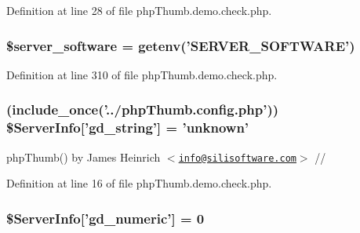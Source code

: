 \-Definition at line 28 of file php\-Thumb.\-demo.\-check.\-php.

\hypertarget{php_thumb_8demo_8check_8php_a21f2f1ca62b06bd0a188ee2e239db5ff}{
\subsubsection[{\$server\-\_\-software}]{\setlength{\rightskip}{0pt plus 5cm}\$server\-\_\-software = getenv('\-S\-E\-R\-V\-E\-R\-\_\-\-S\-O\-F\-T\-W\-A\-R\-E')}}\label{php_thumb_8demo_8check_8php_a21f2f1ca62b06bd0a188ee2e239db5ff}


\-Definition at line 310 of file php\-Thumb.\-demo.\-check.\-php.

\hypertarget{php_thumb_8demo_8check_8php_a9fc19f5767062100c17dfcd62a18cf40}{
\subsubsection[{\$\-Server\-Info}]{ (include\-\_\-once('../php\-Thumb.\-config.\-php')) \$\-Server\-Info\mbox{[}'gd\-\_\-string'\mbox{]} = 'unknown'}}\label{php_thumb_8demo_8check_8php_a9fc19f5767062100c17dfcd62a18cf40}
php\-Thumb() by \-James \-Heinrich $<$\href{mailto:info@silisoftware.com}{\tt info@silisoftware.\-com}$>$ // 

\-Definition at line 16 of file php\-Thumb.\-demo.\-check.\-php.

\hypertarget{php_thumb_8demo_8check_8php_ab117303405551f61aec5f0c7e18bd881}{
\subsubsection[{\$\-Server\-Info}]{\setlength{\rightskip}{0pt plus 5cm}\$\-Server\-Info\mbox{[}'gd\-\_\-numeric'\mbox{]} = 0}}\label{php_thumb_8demo_8check_8php_ab117303405551f61aec5f0c7e18bd881}


